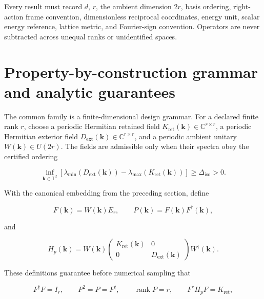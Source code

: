 \documentclass[11pt]{article}
\begin{document}
Every result must record $d$, $r$, the ambient dimension $2r$, basis ordering, right-action
frame convention, dimensionless reciprocal coordinates, energy unit, scalar energy
reference, lattice metric, and Fourier-sign convention. Operators are never subtracted
across unequal ranks or unidentified spaces.

\section{Property-by-construction grammar and analytic guarantees}

The common family is a finite-dimensional design grammar. For a declared finite rank
$r$, choose a periodic Hermitian retained field
$K_{\mathrm{ret}}(\mathbf k)\in\mathbb C^{r\times r}$, a periodic Hermitian exterior
field $D_{\mathrm{ext}}(\mathbf k)\in\mathbb C^{r\times r}$, and a periodic ambient
unitary $W(\mathbf k)\in U(2r)$. The fields are admissible only when their spectra obey
the certified ordering

\begin{equation}
 \inf_{\mathbf k\in\mathbb T^d}
 \left[
 \lambda_{\min}(D_{\mathrm{ext}}(\mathbf k))
 -\lambda_{\max}(K_{\mathrm{ret}}(\mathbf k))
 \right]
 \geq\Delta_{\mathrm{iso}}>0.
 \label{eq:general-construction-gap}
\end{equation}

With the canonical embedding from the preceding section, define

\begin{equation}
 F(\mathbf k)=W(\mathbf k)E_r,
 \qquad
 P(\mathbf k)=F(\mathbf k)F^\dagger(\mathbf k),
 \label{eq:general-construction-frame}
\end{equation}

and

\begin{equation}
 H_p(\mathbf k)=W(\mathbf k)
 \begin{pmatrix}
 K_{\mathrm{ret}}(\mathbf k)&0\\
 0&D_{\mathrm{ext}}(\mathbf k)
 \end{pmatrix}
 W^\dagger(\mathbf k).
 \label{eq:general-construction-parent}
\end{equation}

These definitions guarantee before numerical sampling that

\begin{equation}
 F^\dagger F=I_r,
 \qquad
 P^2=P=P^\dagger,
 \qquad
 \operatorname{rank}P=r,
 \qquad
 F^\dagger H_pF=K_{\mathrm{ret}},
 \label{eq:general-construction-guarantees}
\end{equation}
\end{document}
